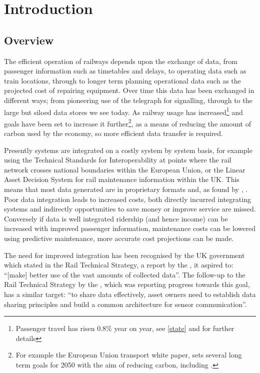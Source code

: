\chapter{Introduction}\label{ch:intro}
\section{Overview}
The efficient operation of railways depends upon the exchange of data, from passenger information such as timetables and delays, to operating data such as train locations, through to longer term planning operational data such as the projected cost of repairing equipment. Over time this data has been exchanged in different ways; from pioneering use of the telegraph for signalling, through to the large but siloed data stores we see today. As railway usage has increased\footnote{Passenger travel has risen 0.8\% year on year, see \autoref{state} and \citep{OfficeofRoad&Rail2016} for further details} and goals have been set to increase it further\footnote{For example the European Union transport white paper, \citet{EC2011} sets several long term goals for 2050 with the aim of reducing carbon, including .}, as a means of reducing the amount of carbon used by the economy, so more efficient data transfer is required. 

Presently systems are integrated on a costly system by system basis, for example using the Technical Standards for Interoperability at points where the rail network crosses national boundaries within the European Union, or the Linear Asset Decision System for rail maintenance information within the UK. This means that most data generated are in proprietary formats and, as found by \citet{Kopf2010}, . Poor data integration leads to increased costs, both directly incurred integrating systems and indirectly opportunities to save money or improve service are missed. Conversely if data is well integrated ridership (and hence income) can be increased with improved passenger information, maintenance costs can be lowered using predictive maintenance, more accurate cost projections can be made.

The need for improved integration has been recognised by the UK government which stated in the Rail Technical Strategy, a report by the \citet{TechnicalStrategyLeadershipGroup2012b}, it aspired to: ``[make] better use of the vast amounts of collected data''. The follow-up to the Rail Technical Strategy by the \citet{RDG2017}, which was reporting progress towards this goal, has a similar target: ``to share data effectively, asset owners need to establish data sharing principles and build a common architecture for sensor communication''.

